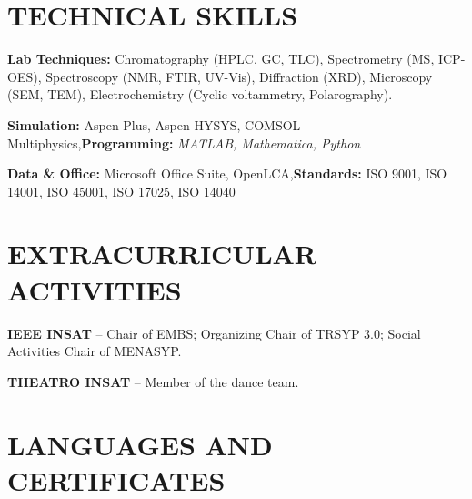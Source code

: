 \documentclass[10pt]{article}
\begin{document}
\section{TECHNICAL SKILLS}
\begin{bul}
\item \textbf{Lab Techniques:} Chromatography (HPLC, GC, TLC), Spectrometry (MS, ICP-OES), Spectroscopy (NMR, FTIR, UV-Vis), Diffraction (XRD), Microscopy (SEM, TEM), Electrochemistry (Cyclic voltammetry, Polarography).
\item \textbf{Simulation:} Aspen Plus, Aspen HYSYS, COMSOL Multiphysics\sep\textbf{Programming:} \textit{MATLAB, Mathematica, Python}
\item \textbf{Data \& Office:} Microsoft Office Suite, OpenLCA\sep\textbf{Standards:} ISO 9001, ISO 14001, ISO 45001, ISO 17025, ISO 14040
\end{bul}

\section{EXTRACURRICULAR ACTIVITIES}
\begin{bul}
\item \textbf{IEEE INSAT} – Chair of EMBS; Organizing Chair of TRSYP 3.0; Social Activities Chair of MENASYP.
\item \textbf{THEATRO INSAT} – Member of the dance team.
\end{bul}

\section{LANGUAGES AND CERTIFICATES}
\end{document}

